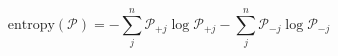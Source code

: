 \begin{equation}
\text{entropy}(\mathcal P) = -\sum_j^n\mathcal P_{+j}\log\mathcal P_{+j} -\sum_j^n\mathcal P_{-j}\log\mathcal P_{-j} 
\end{equation}